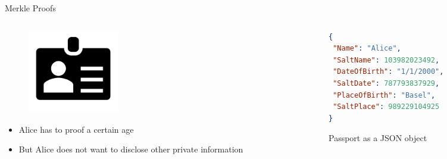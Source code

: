 \documentclass[]{beamer}
\begin{document}
\begin{frame}[fragile]{Merkle Proofs}
	\begin{columns}
		\begin{column}{0.4\textwidth}
			\begin{figure}
				\centering
				\includegraphics[width=4cm]{../assets/images/id.PNG}
			\end{figure}
			\begin{itemize}
				\item<1 ->Alice has to proof a certain age
				\item<2 ->But Alice does not want to disclose other private information
			\end{itemize}
		\end{column}
		\begin{column}{0.6\textwidth}
			\begin{lstlisting}[language=json,firstnumber=1]
{
 "Name": "Alice",
 "SaltName": 103982023492,
 "DateOfBirth": "1/1/2000",
 "SaltDate": 787793837929,
 "PlaceOfBirth": "Basel",
 "SaltPlace": 989229104925
}
			\end{lstlisting}
			\centering
			\scriptsize{Passport as a JSON object}
		\end{column}
	\end{columns}
\end{frame}

\end{document}

